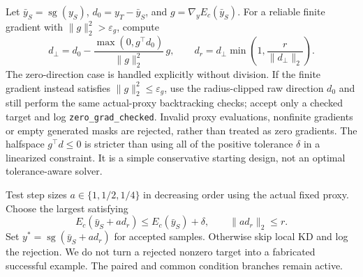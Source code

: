 \documentclass{article}
\newcommand{\sg}{\operatorname{sg}}
\begin{document}
Let $\bar y_S=\sg(y_S)$, $d_0=y_T-\bar y_S$, and $g=\nabla_y E_c(\bar y_S)$. For a reliable finite gradient with $\|g\|_2^2>\varepsilon_g$, compute
\begin{equation}
 d_{\perp}=d_0-
 \frac{\max(0,g^\top d_0)}{\|g\|_2^2}\,g,
 \qquad
 d_r=d_{\perp}\min\left(1,\frac{r}{\|d_{\perp}\|_2}\right).
 \label{eq:projection}
\end{equation}
The zero-direction case is handled explicitly without division. If the finite gradient instead satisfies $\|g\|_2^2\le\varepsilon_g$, use the radius-clipped raw direction $d_0$ and still perform the same actual-proxy backtracking checks; accept only a checked target and log \texttt{zero\_grad\_checked}. Invalid proxy evaluations, nonfinite gradients or empty generated masks are rejected, rather than treated as zero gradients. The halfspace $g^\top d\le0$ is stricter than using all of the positive tolerance $\delta$ in a linearized constraint. It is a simple conservative starting design, not an optimal tolerance-aware solver.

Test step sizes $a\in\{1,1/2,1/4\}$ in decreasing order using the actual fixed proxy. Choose the largest satisfying
\begin{equation}
 E_c(\bar y_S+a d_r)\le E_c(\bar y_S)+\delta,
 \qquad \|a d_r\|_2\le r.
 \label{eq:check}
\end{equation}
Set $y^*=\sg(\bar y_S+a d_r)$ for accepted samples. Otherwise skip local KD and log the rejection. We do not turn a rejected nonzero target into a fabricated successful example. The paired and common condition branches remain active.
\end{document}
